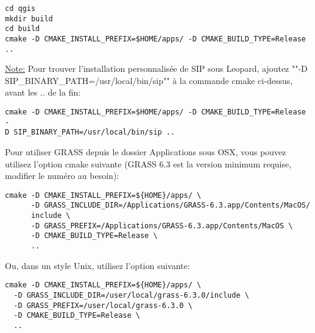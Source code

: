 \begin{verbatim}
cd qgis
mkdir build
cd build
cmake -D CMAKE_INSTALL_PREFIX=$HOME/apps/ -D CMAKE_BUILD_TYPE=Release ..
\end{verbatim}

\underline{Note:} Pour trouver l'installation personnalisée de SIP sous Leopard, ajoutez ""-D SIP\_BINARY\_PATH=/usr/local/bin/sip"" à la commande cmake ci-dessus, avant les .. de la fin:

\begin{verbatim}
cmake -D CMAKE_INSTALL_PREFIX=$HOME/apps/ -D CMAKE_BUILD_TYPE=Release -
D SIP_BINARY_PATH=/usr/local/bin/sip ..
\end{verbatim}

Pour utiliser GRASS depuis le dossier Applications sous OSX, vous pouvez utilisez l'option cmake suivante (GRASS 6.3 est la version minimum requise, modifier le numéro au besoin):

\begin{verbatim}
cmake -D CMAKE_INSTALL_PREFIX=${HOME}/apps/ \
      -D GRASS_INCLUDE_DIR=/Applications/GRASS-6.3.app/Contents/MacOS/
      include \
      -D GRASS_PREFIX=/Applications/GRASS-6.3.app/Contents/MacOS \
      -D CMAKE_BUILD_TYPE=Release \
      ..
\end{verbatim}

Ou, dans un style Unix, utilisez l'option suivante:

\begin{verbatim}
cmake -D CMAKE_INSTALL_PREFIX=${HOME}/apps/ \
  -D GRASS_INCLUDE_DIR=/user/local/grass-6.3.0/include \
  -D GRASS_PREFIX=/user/local/grass-6.3.0 \
  -D CMAKE_BUILD_TYPE=Release \
  ..
\end{verbatim}

